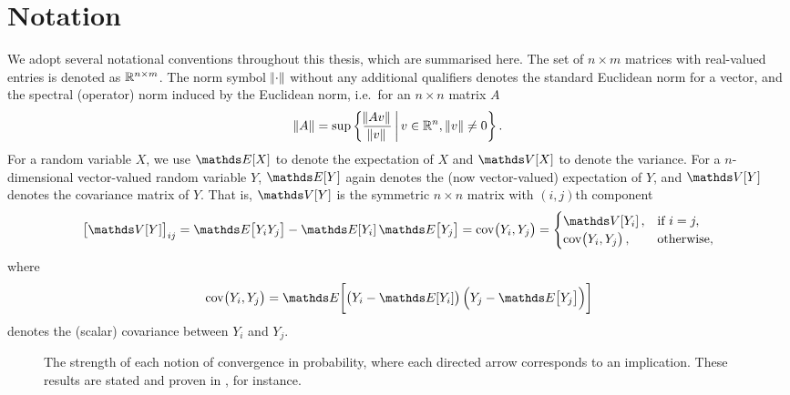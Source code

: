 \section{Notation}
We adopt several notational conventions throughout this thesis, which are summarised here.
The set of \(n \times m\) matrices with real-valued entries is denoted as \(\mathbb{R}^{n\times m}\).
The norm symbol \(\norm{\cdot}\) without any additional qualifiers denotes the standard Euclidean norm for a vector, and the spectral (operator) norm induced by the Euclidean norm, i.e.\ for an \(n \times n\) matrix \(A\)
\[
	\norm{A} = \sup\left\{\frac{\norm{Av}}{\norm{v}}\,\middle|\,v \in \mathbb{R}^n, \, \norm{v} \neq 0\right\}.
\]
For a random variable \(X\), we use \(\avg{X}\) to denote the expectation of \(X\) and \(\var{X}\) to denote the variance.
For a \(n\)-dimensional vector-valued random variable \(Y\), \(\avg{Y}\) again denotes the (now vector-valued) expectation of \(Y\), and \(\var{Y}\) denotes the covariance matrix of \(Y\).
That is, \(\var{Y}\) is the symmetric \(n\times n\) matrix with \((i,j)\)th component
\[
	\left[\var{Y}\right]_{ij} = \avg{Y_iY_j} - \avg{Y_i}\avg{Y_j} = \cov{Y_i, Y_j} = \begin{cases}
		\var{Y_i},      & \text{if } i = j, \\
		\cov{Y_i, Y_j}, & \text{otherwise},
	\end{cases}
\]
where
\[
	\cov{Y_i, Y_j} = \avg{\left(Y_i - \avg{Y_i}\right)\left(Y_j - \avg{Y_j}\right)}
\]
denotes the (scalar) covariance between \(Y_i\) and \(Y_j\).

\usetikzlibrary{positioning}
\begin{figure}
	\begin{center}
		\caption{The strength of each notion of convergence in probability, where each directed arrow corresponds to an implication.
			These results are stated and proven in \citet{Bremaud_2020_ProbabilityTheoryStochastic}, for instance.}
		\label{fig:rv_conv_impl}
	\end{center}
\end{figure}

